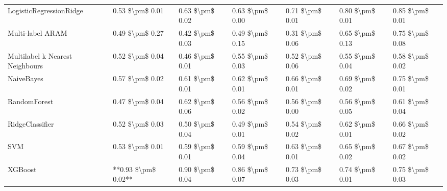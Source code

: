 \begin{tabular}{lllllll}
        LogisticRegressionRidge &     0.53 \$\textbackslash pm\$ 0.01 &           0.63 \$\textbackslash pm\$ 0.02 &       0.63 \$\textbackslash pm\$ 0.00 &        0.71 \$\textbackslash pm\$ 0.01 &                         0.80 \$\textbackslash pm\$ 0.01 & 0.85 \$\textbackslash pm\$ 0.01 \\
               Multi-label ARAM &     0.49 \$\textbackslash pm\$ 0.27 &           0.42 \$\textbackslash pm\$ 0.03 &       0.49 \$\textbackslash pm\$ 0.15 &        0.31 \$\textbackslash pm\$ 0.06 &                         0.65 \$\textbackslash pm\$ 0.13 & 0.75 \$\textbackslash pm\$ 0.08 \\
Multilabel k Nearest Neighbours &     0.52 \$\textbackslash pm\$ 0.04 &           0.46 \$\textbackslash pm\$ 0.01 &       0.55 \$\textbackslash pm\$ 0.03 &        0.52 \$\textbackslash pm\$ 0.06 &                         0.55 \$\textbackslash pm\$ 0.04 & 0.58 \$\textbackslash pm\$ 0.02 \\
                     NaiveBayes &     0.57 \$\textbackslash pm\$ 0.02 &           0.61 \$\textbackslash pm\$ 0.01 &       0.62 \$\textbackslash pm\$ 0.01 &        0.66 \$\textbackslash pm\$ 0.01 &                         0.69 \$\textbackslash pm\$ 0.02 & 0.75 \$\textbackslash pm\$ 0.01 \\
                   RandomForest &     0.47 \$\textbackslash pm\$ 0.04 &           0.62 \$\textbackslash pm\$ 0.06 &       0.56 \$\textbackslash pm\$ 0.02 &        0.56 \$\textbackslash pm\$ 0.00 &                         0.56 \$\textbackslash pm\$ 0.05 & 0.61 \$\textbackslash pm\$ 0.04 \\
                RidgeClassifier &     0.52 \$\textbackslash pm\$ 0.03 &           0.50 \$\textbackslash pm\$ 0.04 &       0.49 \$\textbackslash pm\$ 0.01 &        0.54 \$\textbackslash pm\$ 0.02 &                         0.62 \$\textbackslash pm\$ 0.01 & 0.66 \$\textbackslash pm\$ 0.02 \\
                            SVM &     0.53 \$\textbackslash pm\$ 0.01 &           0.59 \$\textbackslash pm\$ 0.01 &       0.59 \$\textbackslash pm\$ 0.04 &        0.63 \$\textbackslash pm\$ 0.01 &                         0.65 \$\textbackslash pm\$ 0.02 & 0.67 \$\textbackslash pm\$ 0.02 \\
                        XGBoost & **0.93 \$\textbackslash pm\$ 0.02** &           0.90 \$\textbackslash pm\$ 0.04 &       0.86 \$\textbackslash pm\$ 0.07 &        0.73 \$\textbackslash pm\$ 0.03 &                         0.74 \$\textbackslash pm\$ 0.01 & 0.75 \$\textbackslash pm\$ 0.03 \\
\bottomrule
\end{tabular}

